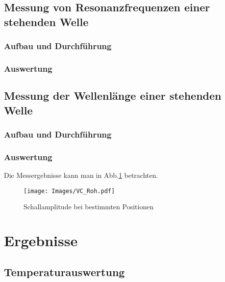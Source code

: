 \documentclass[]{article}
\begin{document}
	
	\subsection{Messung von Resonanzfrequenzen einer stehenden Welle}
	\subsubsection{Aufbau und Durchführung}
	\subsubsection{Auswertung}
	
	\subsection{Messung der Wellenlänge einer stehenden Welle}
	\subsubsection{Aufbau und Durchführung}
	\subsubsection{Auswertung}
	Die Messergebnisse kann man in Abb.\ref{Vc_Roh} betrachten.
	
	\begin{figure}
	\begin{center}
		\texttt{[image: Images/VC\_Roh.pdf]}
		\caption{Schallamplitude bei bestimmten Positionen}
		\label{Vc_Roh}
	\end{center}
	\end{figure}
	
	
	\section{Ergebnisse}
	\subsection{Temperaturauswertung}
	
\end{document}
